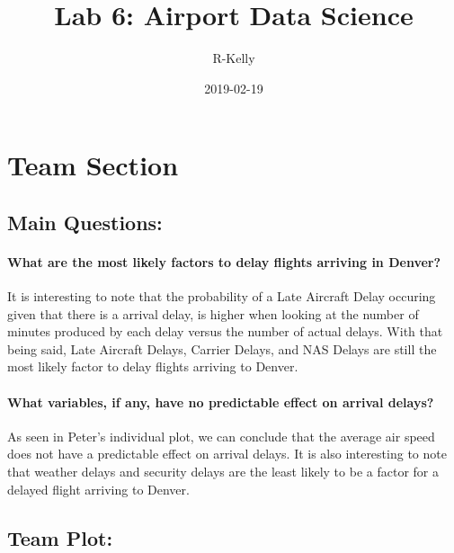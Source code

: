 \documentclass[]{article}
\title{Lab 6: Airport Data Science}
\author{R-Kelly}
\date{2019-02-19}
\let\oldparagraph\paragraph
\renewcommand{\paragraph}[1]{\oldparagraph{#1}\mbox{}}
\begin{document}
\maketitle

\section{Team Section}\label{team-section}

\subsection{Main Questions:}\label{main-questions}

\paragraph{What are the most likely factors to delay flights arriving in
Denver?}\label{what-are-the-most-likely-factors-to-delay-flights-arriving-in-denver}

It is interesting to note that the probability of a Late Aircraft Delay
occuring given that there is a arrival delay, is higher when looking at
the number of minutes produced by each delay versus the number of actual
delays. With that being said, Late Aircraft Delays, Carrier Delays, and
NAS Delays are still the most likely factor to delay flights arriving to
Denver.

\paragraph{What variables, if any, have no predictable effect on arrival
delays?}\label{what-variables-if-any-have-no-predictable-effect-on-arrival-delays}

As seen in Peter's individual plot, we can conclude that the average air
speed does not have a predictable effect on arrival delays. It is also
interesting to note that weather delays and security delays are the
least likely to be a factor for a delayed flight arriving to Denver.

\subsection{Team Plot:}\label{team-plot}
\end{document}
